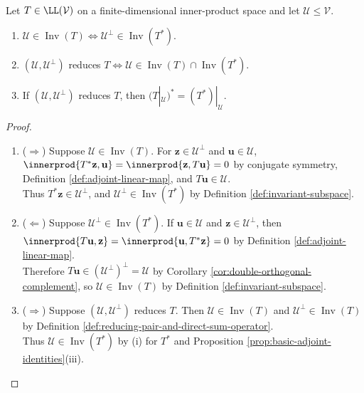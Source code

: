 \begin{theorem} \label{thm:adjoint-invariant-subspace-orthogonal-complement} \\
Let $T\in\LL(\mathcal{V})$ on a finite-dimensional inner-product space and let $\mathcal{U}\leq\mathcal{V}$.
\begin{enumerate}[label=(\roman*)]
\setlength{\itemsep}{0pt}
\item $\mathcal{U}\in\operatorname{Inv}(T)\Longleftrightarrow\mathcal{U}^{\perp}\in\operatorname{Inv}(T^*)$.
\item $(\mathcal{U},\mathcal{U}^{\perp})$ reduces $T\Longleftrightarrow\mathcal{U}\in\operatorname{Inv}(T)\cap\operatorname{Inv}(T^*)$.
\item If $(\mathcal{U},\mathcal{U}^{\perp})$ reduces $T$, then $(T|_{\mathcal{U}})^*=(T^*)|_{\mathcal{U}}$.
\end{enumerate}
\begin{proof}
\begin{enumerate}[label=(\roman*)]
\setlength{\itemsep}{0pt}
\item[$(i)$] ($\Rightarrow$) Suppose $\mathcal{U}\in\operatorname{Inv}(T)$. For $\mathbf{z}\in\mathcal{U}^{\perp}$ and $\mathbf{u}\in\mathcal{U}$, $\innerprod{T^*\mathbf{z},\mathbf{u}}=\innerprod{\mathbf{z},T\mathbf{u}}=0$ by conjugate symmetry, Definition \ref{def:adjoint-linear-map}, and $T\mathbf{u}\in\mathcal{U}$.\\
Thus $T^*\mathbf{z}\in\mathcal{U}^{\perp}$, and $\mathcal{U}^{\perp}\in\operatorname{Inv}(T^*)$ by Definition \ref{def:invariant-subspace}.
\item[$(i)$] ($\Leftarrow$) Suppose $\mathcal{U}^{\perp}\in\operatorname{Inv}(T^*)$. If $\mathbf{u}\in\mathcal{U}$ and $\mathbf{z}\in\mathcal{U}^{\perp}$, then $\innerprod{T\mathbf{u},\mathbf{z}}=\innerprod{\mathbf{u},T^*\mathbf{z}}=0$ by Definition \ref{def:adjoint-linear-map}.\\
Therefore $T\mathbf{u}\in(\mathcal{U}^{\perp})^{\perp}=\mathcal{U}$ by Corollary \ref{cor:double-orthogonal-complement}, so $\mathcal{U}\in\operatorname{Inv}(T)$ by Definition \ref{def:invariant-subspace}.
\item[$(ii)$] ($\Rightarrow$) Suppose $(\mathcal{U},\mathcal{U}^{\perp})$ reduces $T$. Then $\mathcal{U}\in\operatorname{Inv}(T)$ and $\mathcal{U}^{\perp}\in\operatorname{Inv}(T)$ by Definition \ref{def:reducing-pair-and-direct-sum-operator}.\\
Thus $\mathcal{U}\in\operatorname{Inv}(T^*)$ by (i) for $T^*$ and Proposition \ref{prop:basic-adjoint-identities}(iii).

\end{enumerate}
\end{proof}
\end{theorem}
